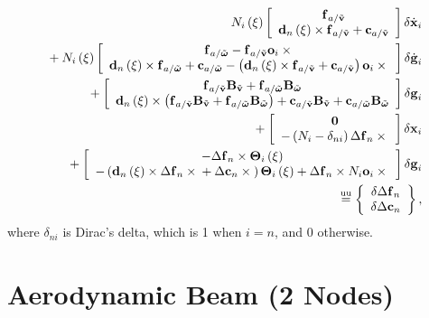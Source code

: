 \begin{align}
	N_i\plbr{\xi} \sqbr{\matr{c}{
		\T{f}_{a/\tilde{\T{v}}} \\
		\T{d}_n\plbr{\xi} \times \T{f}_{a/\tilde{\T{v}}}
		+ \T{c}_{a/\tilde{\T{v}}}
	}} \delta\dot{\T{x}}_i
	\nonumber \\
%
	\mbox{}
	+ N_i\plbr{\xi} \sqbr{\matr{c}{
		\T{f}_{a/\tilde{\T{\omega}}}
		- \T{f}_{a/\tilde{\T{v}}} \T{o}_i \times{} \\
		\T{d}_n\plbr{\xi} \times \T{f}_{a/\tilde{\T{\omega}}}
		+ \T{c}_{a/\tilde{\T{\omega}}}
		- \plbr{
			\T{d}_n\plbr{\xi} \times \T{f}_{a/\tilde{\T{v}}}
			+ \T{c}_{a/\tilde{\T{v}}}
		} \T{o}_i \times{}
	}} \delta\dot{\T{g}}_i
	\nonumber \\
%
	\mbox{}
	+ \sqbr{\matr{c}{
		\T{f}_{a/\tilde{\T{v}}} \TT{B}_{\tilde{\T{v}}}
			+ \T{f}_{a/\tilde{\T{\omega}}} \TT{B}_{\tilde{\T{\omega}}} \\
		\T{d}_n\plbr{\xi} \times \plbr{
			\T{f}_{a/\tilde{\T{v}}} \TT{B}_{\tilde{\T{v}}}
				+ \T{f}_{a/\tilde{\T{\omega}}} \TT{B}_{\tilde{\T{\omega}}}
		}
		+ \T{c}_{a/\tilde{\T{v}}} \TT{B}_{\tilde{\T{v}}}
			+ \T{c}_{a/\tilde{\T{\omega}}} \TT{B}_{\tilde{\T{\omega}}}
	}} \delta\T{g}_i
	\nonumber \\
%
	\mbox{}
	+ \sqbr{\matr{c}{
		\TT{0} \\
		- \plbr{
			N_i - \delta_{ni}
		} \Delta\T{f}_n \times{}
	}} \delta\T{x}_i
	\nonumber \\
%
	\mbox{}
	+ \sqbr{\matr{c}{
		- \Delta\T{f}_n \times \TT{\Theta}_i\plbr{\xi} \\
		- \plbr{
			\T{d}_n\plbr{\xi} \times \Delta\T{f}_n \times{}
			+ \Delta\T{c}_n \times{}
		} \TT{\Theta}_i\plbr{\xi}
		+ \Delta\T{f}_n \times N_i \T{o}_i \times{}
	}} \delta\T{g}_i
	\nonumber \\
%
	\equu
	\cubr{\cvvect{
		\delta\Delta\T{f}_n \\
		\delta\Delta\T{c}_n
	}}
	,
\end{align}
where $\delta_{ni}$ is Dirac's delta, which is 1 when $i=n$, and 0 otherwise.

\section{Aerodynamic Beam (2 Nodes)}



